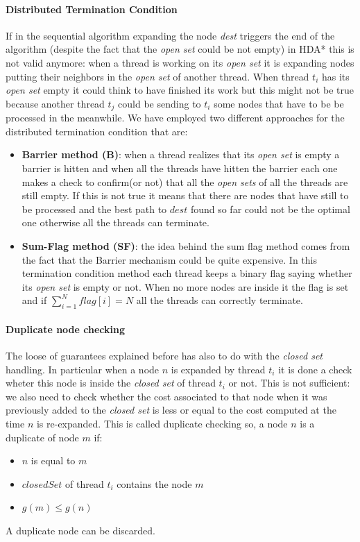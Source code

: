 \documentclass[twocolumn, switch]{article} %
\begin{document}
\paragraph{Distributed Termination Condition}
If in the sequential algorithm expanding the node \textit{dest} triggers the end of the algorithm (despite
the fact that the \textit{open set} could be not empty) in HDA* this is not valid anymore: when a thread
is working on its \textit{open set} it is expanding nodes putting their neighbors in the
\textit{open set} of another thread. When thread $t_i$ has its \textit{open set} empty it could think
to have finished its work but this might not be true because another thread $t_j$ could be sending
to $t_i$ some nodes that have to be be processed in the meanwhile. We have employed two
different approaches for the distributed termination condition that are:
\begin{itemize}
  \item \textbf{Barrier method (B)}: when a thread realizes that its \textit{open set} is
        empty a barrier is 
        hitten and when all the threads have hitten the barrier
        each one makes a check to confirm(or not) that all the \textit{open sets} of all
        the threads are still empty. If this is not true it means that there are nodes
        that have still to be processed and the best path to $dest$ found so far could
        not be the optimal one otherwise all the threads can terminate.
  \item \textbf{Sum-Flag method (SF)}: the idea behind the sum flag method comes from the fact that
        the Barrier mechanism could be quite expensive. In this termination condition method
        each thread keeps a binary flag saying whether its \textit{open set} is empty
        or not. When no more nodes are inside it the flag is set and if $\sum_{i=1}^{N}flag[i] = N$
        all the threads can correctly terminate.
\end{itemize}
\paragraph{Duplicate node checking}
The loose of guarantees explained before has also to do with the \textit{closed set} handling. In particular
when a node $n$ is expanded by thread $t_i$ it is done a check wheter this node is inside the \textit{closed set}
of thread $t_i$ or not. This is not sufficient: we also need to check whether the cost associated to that node 
when it was previously added to the \textit{closed set} is less or equal to the cost computed at the time $n$ is re-expanded. 
This is called duplicate checking so, a node $n$ is a duplicate of node $m$ if:
\begin{itemize} 
  \item $n$ is equal to $m$
  \item $closedSet$ of thread $t_i$ contains the node $m$
  \item $g(m) \le g(n)$
\end{itemize}
A duplicate node can be discarded.
\end{document}
